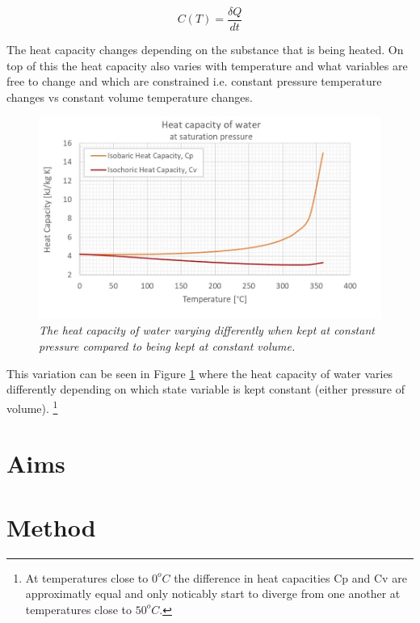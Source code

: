 \documentclass[10pt]{article}
\begin{document}
\begin{equation}\label{eq:heat_cap}
    C(T) = \frac{\delta Q}{dt}
\end{equation}

The heat capacity changes depending on the substance that is being heated. On top of this the heat capacity also varies with temperature and what variables are free to change and which are constrained i.e. constant pressure temperature changes vs constant volume temperature changes. 

\begin{figure}
    \centering
    \includegraphics[scale=1.0]{Heat_capacity_C.jpg}
    \caption{\it{The heat capacity of water varying differently when kept at constant pressure compared to being kept at constant volume\cite{heat_cap}.}}
    \label{fig:heat_cap_water}
\end{figure}

This variation can be seen in Figure \ref{fig:heat_cap_water} where the heat capacity of water varies differently depending on which state variable is kept constant (either pressure of volume). \footnote{At temperatures close to $0^oC$ the difference in heat capacities Cp and Cv are approximatly equal and only noticably start to diverge from one another at temperatures close to $50^oC$.}







\section*{Aims}

\section*{Method}
\end{document}
